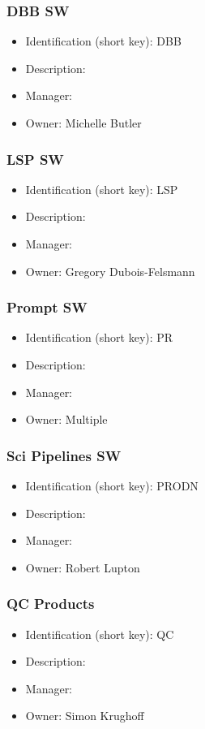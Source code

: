 \subsubsection{DBB SW}\label{sect:DBB}
\begin{itemize}
\item Identification (short key): DBB
\item Description: 
\item Manager: 
\item Owner: Michelle Butler
\end{itemize}

\subsubsection{LSP SW}\label{sect:LSP}
\begin{itemize}
\item Identification (short key): LSP
\item Description: 
\item Manager: 
\item Owner: Gregory Dubois-Felsmann
\end{itemize}

\subsubsection{Prompt SW}\label{sect:PR}
\begin{itemize}
\item Identification (short key): PR
\item Description: 
\item Manager: 
\item Owner: Multiple
\end{itemize}

\subsubsection{Sci Pipelines SW}\label{sect:PRODN}
\begin{itemize}
\item Identification (short key): PRODN
\item Description: 
\item Manager: 
\item Owner: Robert Lupton
\end{itemize}

\subsubsection{QC Products}\label{sect:QC}
\begin{itemize}
\item Identification (short key): QC
\item Description: 
\item Manager: 
\item Owner: Simon Krughoff
\end{itemize}


